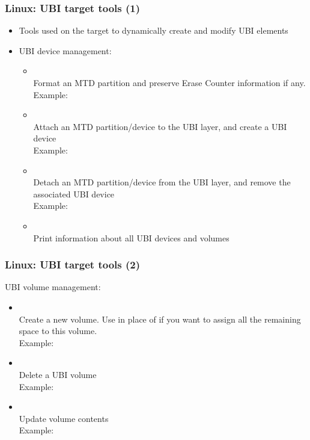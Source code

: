 \begin{frame}
  \frametitle{Linux: UBI target tools (1)}
  \begin{itemize}
  \item Tools used on the target to dynamically create and modify
      UBI elements
  \item UBI device management:
    \begin{itemize}
    \item {}\\
	Format an MTD partition and preserve Erase Counter information if any.\\
	Example: 
    \item {}\\
	Attach an MTD partition/device to the UBI layer, and create a
        UBI device\\
        Example:  
    \item {}\\
	Detach an MTD partition/device from the UBI layer, and remove
        the associated UBI device\\
        Example: 
    \item {}\\
        Print information about all UBI devices and volumes
    \end{itemize}
  \end{itemize}
\end{frame}

\begin{frame}
  \frametitle{Linux: UBI target tools (2)}
  UBI volume management:
    \begin{itemize}
    \item {\small {}}\\
	Create a new volume. Use  in place of 
	if you want to assign all the remaining space to this volume.\\
        Example: 
    \item {\small {}}\\
	Delete a UBI volume\\
        Example: 
    \item {\small {}}\\
	Update volume contents\\
        Example: 
    \end{itemize}
\end{frame}

